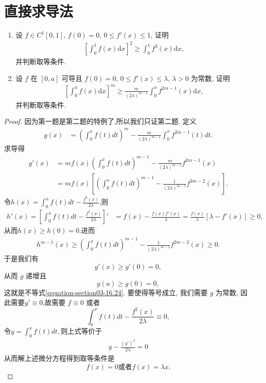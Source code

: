 \documentclass[../../main.tex]{subfiles}
\begin{document}
\section{直接求导法}

\begin{example}
\begin{enumerate}
\item 设 $f \in C^1[0,1]$, $f(0) = 0$, $0 \leqslant f'(x) \leqslant 1$, 证明
\begin{align*}
\left[\int_{0}^{1}f(x)\mathrm{d}x\right]^2 \geqslant \int_{0}^{1}f^3(x)\mathrm{d}x,
\end{align*}
并判断取等条件.

\item 设 $f$ 在 $[0,a]$ 可导且 $f(0) = 0$, $0 \leqslant f'(x) \leqslant \lambda$, $\lambda > 0$ 为常数, 证明
\begin{align}\label{equation-section03-16.24}
\left[\int_{0}^{a}f(x)\mathrm{d}x\right]^m \geqslant \frac{m}{(2\lambda)^{m - 1}}\int_{0}^{a}f^{2m - 1}(x)\mathrm{d}x,
\end{align}
并判断取等条件.
\end{enumerate}
\end{example}
\begin{proof}
因为第一题是第二题的特例了,所以我们只证第二题.
定义
\begin{align*}
g(x) &= \left(\int_{0}^{x}f(t)dt\right)^m - \frac{m}{(2\lambda)^{m - 1}}\int_{0}^{x}f^{2m - 1}(t)dt.
\end{align*}
求导得
\begin{align*}
g'(x) &= mf(x)\left(\int_{0}^{x}f(t)dt\right)^{m - 1} - \frac{m}{(2\lambda)^{m - 1}}f^{2m - 1}(x)\\
&= mf(x)\left[\left(\int_{0}^{x}f(t)dt\right)^{m - 1} - \frac{1}{(2\lambda)^{m - 1}}f^{2m - 2}(x)\right].
\end{align*}
令$h(x)=\int_{0}^{x}f(t)dt - \frac{f^2(x)}{2\lambda}$,则
\begin{align*}
h'(x)=\left[\int_{0}^{x}f(t)dt - \frac{f^2(x)}{2\lambda}\right]' &= f(x) - \frac{f(x)f'(x)}{\lambda} = \frac{f(x)}{\lambda}[\lambda - f'(x)] \geqslant 0,
\end{align*}
从而$h(x)\geq h(0)=0.$进而
\begin{align*}
h^{m-1}(x)\geqslant \left(\int_{0}^{x}f(t)dt\right)^{m - 1} - \frac{1}{(2\lambda)^{m - 1}}f^{2m - 2}(x)\geqslant 0.
\end{align*}
于是我们有
\[g'(x) \geqslant g'(0) = 0,\]
从而 $g$ 递增且
\[g(a) \geqslant g(0) = 0,\]
这就是不等式\eqref{equation-section03-16.24}.
要使得等号成立, 我们需要 $g$ 为常数, 因此需要$g'\equiv 0$,故需要 $f \equiv 0$ 或者
\[\int_{0}^{x}f(t)dt - \frac{f^2(x)}{2\lambda} \equiv 0,\]
令$y=\int_{0}^{x}f(t)dt,$则上式等价于
\begin{align*}
y-\frac{(y')^2}{2\lambda}=0
\end{align*}
从而解上述微分方程得到取等条件是
\[f(x) = 0\text{或者}f(x) = \lambda x.\]
\end{proof}
\end{document}
